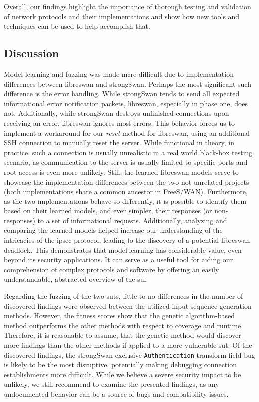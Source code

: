 Overall, our findings highlight the importance of thorough testing and validation of network protocols and their implementations and show how new tools and techniques can be used to help accomplish that.

\subsection{Discussion}
Model learning and fuzzing was made more difficult due to implementation differences between libreswan and strongSwan. Perhaps the most significant such difference is the error handling. While strongSwan tends to send all expected informational error notification packets, libreswan, especially in phase one, does not. Additionally, while strongSwan destroys unfinished connections upon receiving an error, libreswan ignores most errors. This behavior forces us to implement a workaround for our \emph{reset} method for libreswan, using an additional SSH connection to manually reset the server. While functional in theory, in practice, such a connection is usually unrealistic in a real world black-box testing scenario, as communication to the server is usually limited to specific ports and root access is even more unlikely. Still, the learned libreswan models serve to showcase the implementation differences between the two not unrelated projects (both implementations share a common ancestor in FreeS/WAN). Furthermore, as the two implementations behave so differently, it is possible to identify them based on their learned models, and even simpler, their responses (or non-responses) to a set of informational requests. Additionally, analyzing and comparing the learned models helped increase our understanding of the intricacies of the \ac{ipsec} protocol, leading to the discovery of a potential libreswan deadlock. This demonstrates that model learning has considerable value, even beyond its security applications. It can serve as a useful tool for aiding our comprehension of complex protocols and software by offering an easily understandable, abstracted overview of the \ac{sul}.

Regarding the fuzzing of the two \acp{sut}, little to no differences in the number of discovered findings were observed between the utilized input sequence-generation methods. However, the fitness scores show that the genetic algorithm-based method outperforms the other methods with respect to coverage and runtime. Therefore, it is reasonable to assume, that the genetic method would discover more findings than the other methods if applied to a more vulnerable \ac{sut}. Of the discovered findings, the strongSwan exclusive \texttt{Authentication} transform field bug is likely to be the most disruptive, potentially making debugging connection establishments more difficult. While we believe a severe security impact to be unlikely, we still recommend to examine the presented findings, as any undocumented behavior can be a source of bugs and compatibility issues. 


